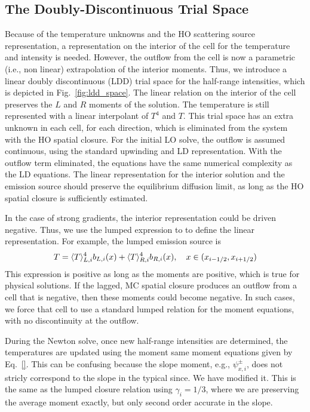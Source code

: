\subsection{The Doubly-Discontinuous Trial Space}

Because of the temperature unknowns and the HO scattering source representation, a
representation on the interior of the cell for the temperature and intensity is needed.
However, the outflow from the cell is now a parametric (i.e., non linear)
extrapolation of the interior moments. Thus, we introduce a linear doubly
discontinuous (LDD) trial space for the half-range intensities, which is depicted in Fig.~\ref{fig:ldd_space}.
The linear relation on the interior of the cell preserves the $L$ and $R$ moments of the
solution.  The temperature is still represented with a linear interpolant of $T^4$ and
$T$.  This trial space has an extra unknown in each cell, for each direction, which is eliminated from the system
with the HO spatial closure.  For the initial LO solve, the outflow is assumed continuous, using the standard
upwinding and LD representation.  With the outflow term eliminated, the equations
have the same numerical complexity as the LD equations.  The linear representation for the
interior solution and the emission source should preserve the equilibrium diffusion limit,
as long as the HO spatial closure is sufficiently estimated.

In the case of strong gradients, the interior representation could be driven
negative.  Thus, we use the lumped expression to to define the linear representation.  For
example, the lumped emission source is
\begin{equation}
    T = \langle T \rangle_{L,i}^4 b_{L,i}(x) + \langle T \rangle_{R,i}^4 b_{R,i}(x) , \quad x\in({x_{i-1/2}},{x_{i+1/2}})
\end{equation}
This expression is positive as long as the moments are positive, which is true for
physical solutions.  If the lagged, MC spatial closure produces an outflow from a cell that is
negative, then these moments could become negative.  In such cases, we force that cell to
use a standard lumped relation for the moment equations, with no discontinuity at the
outflow.  

During the Newton solve, once new half-range
intensities are determined, the temperatures are updated using the moment same moment
equations given by Eq.~\eqref{}. This can be confusing because the slope moment,
e.g., $\psi_{x,i}^\pm$, does not stricly correspond to the slope in the typical since.
We have modified it.  This is the same as the lumped closure relation using
$\gamma_i=1/3$, where we are preserving the average moment exactly, but only second order
accurate in the slope.


